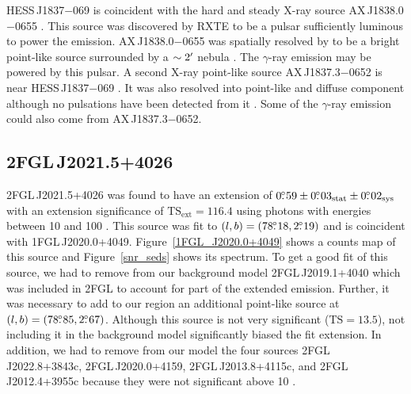\documentclass[12pt,preprint]{aastex}
\newcommand{\gev}{\text{GeV}\xspace}
\newcommand{\tev}{\text{TeV}\xspace}
\newcommand{\tsext}{{\ensuremath{\text{TS}_{\text{ext}}}}\xspace}
\newcommand{\chandra}{\text{{\em Chandra}}\xspace}
\newcommand{\ts}{\text{TS}\xspace}
\newcommand{\sys}{\text{sys}\xspace}
\newcommand{\stat}{\text{stat}\xspace}
\begin{document}
HESS\,J1837$-$069 is coincident
with the hard and steady X-ray source AX\,J1838.0$-$0655
\citep{einstein_galactic_plane_survey,hard_x-ray_asca,integral_AX_J1838.0-0655,swift_follow_up,pulsations_HESS_J1837-069,suzaku_HESS_J1837-069}.
This source was discovered by RXTE to be a pulsar sufficiently
luminous to power the \tev emission.  AX\,J1838.0$-$0655 was spatially
resolved by \chandra to be a bright point-like source surrounded by
a $\sim2\mbox{$^\prime$}$ nebula \citep{pulsations_HESS_J1837-069}. The
$\gamma$-ray emission may be powered by this pulsar.  A second X-ray
point-like source AX\,J1837.3$-$0652 is near HESS\,J1837$-$069
\citep{hard_x-ray_asca,swift_follow_up,pulsations_HESS_J1837-069,suzaku_HESS_J1837-069}.
It was also resolved into point-like and diffuse component
although no pulsations have been detected from it
\citep{pulsations_HESS_J1837-069}. Some of the $\gamma$-ray emission
could also come from AX\,J1837.3$-$0652.


\subsection{2FGL\,J2021.5+4026}
\label{section_2FGL J2021.5+4026}



2FGL\,J2021.5+4026 was found to have an extension of
$0\fdg59\pm0\fdg03_\stat\pm0\fdg02_\sys$ with an extension significance
of $\tsext=116.4$ using 
 photons with energies between
10 \gev and 100 \gev.  This source
was fit to $(l,b)=(78\mbox{$.\!\!^\circ$}18,2\mbox{$.\!\!^\circ$}19)$ and is
coincident with 1FGL\,J2020.0+4049. 
Figure~\ref{1FGL_J2020.0+4049} shows a counts map of this source
and Figure~\ref{snr_seds} shows its spectrum.  
To get a good fit of this source, we had to remove from our background
model 2FGL\,J2019.1+4040 which was included in 2FGL to account for
part of the extended emission.
Further, it was necessary to add to our region an additional point-like source 
at
$(l,b)=(78\mbox{$.\!\!^\circ$}85,2\mbox{$.\!\!^\circ$}67)$.
Although this source is not very significant
($\ts=13.5$), not including it in the
background model significantly biased the fit extension.
In addition, we had to remove from our model the four 
sources 2FGL\,J2022.8+3843c, 2FGL\,J2020.0+4159, 2FGL\,J2013.8+4115c,
and 2FGL\,J2012.4+3955c because they were not significant
above 10 \gev.  
\end{document}
